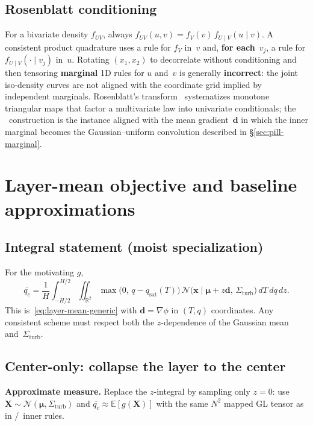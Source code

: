 \documentclass[11pt,a4paper]{article}
\begin{document}
\subsection{Rosenblatt conditioning}
\label{sec:rosenblatt}
For a bivariate density $f_{UV}$, always $f_{UV}(u,v)=f_V(v)\,f_{U\mid V}(u\mid v)$.
A consistent product quadrature uses a rule for $f_V$ in~$v$ and, \textbf{for each}~$v_j$, a rule for $f_{U\mid V}(\cdot\mid v_j)$ in~$u$.
Rotating $(x_1,x_2)$ to decorrelate without conditioning and then tensoring \textbf{marginal} 1D rules for $u$ and~$v$ is generally \textbf{incorrect}: the joint iso-density curves are not aligned with the coordinate grid implied by independent marginals.
Rosenblatt's transform~\cite{rosenblatt} systematizes monotone triangular maps that factor a multivariate law into univariate conditionals; the \profileros\ construction is the instance aligned with the mean gradient~$\mathbf{d}$ in which the inner marginal becomes the Gaussian--uniform convolution described in \S\ref{sec:pill-marginal}.

\section{Layer-mean objective and baseline approximations}
\label{sec:baselines}

\subsection{Integral statement (moist specialization)}
For the motivating $g$,
\begin{equation}
\label{eq:qc-integral}
  \overline{q_c} = \frac{1}{H}\int_{-H/2}^{H/2} \iint_{\mathbb{R}^2}
  \max\bigl(0,\, q - q_{\mathrm{sat}}(T)\bigr)\,
  \mathcal{N}\bigl(\mathbf{x}\mid \boldsymbol{\mu}+z\mathbf{d},\,\Sigma_{\mathrm{turb}}\bigr)\,dT\,dq\,dz .
\end{equation}
This is~\eqref{eq:layer-mean-generic} with $\mathbf{d}=\nabla\phi$ in $(T,q)$ coordinates.
Any consistent scheme must respect both the $z$-dependence of the Gaussian mean and~$\Sigma_{\mathrm{turb}}$.

\subsection{Center-only: collapse the layer to the center}
\textbf{Approximate measure.}
Replace the $z$-integral by sampling only $z=0$: use $\mathbf{X}\sim\mathcal{N}(\boldsymbol{\mu},\Sigma_{\mathrm{turb}})$ and $\overline{q_c}\approx\mathbb{E}[g(\mathbf{X})]$ with the same $N^2$ mapped GL tensor as in \momentmatched/\columntensor\ inner rules.
\end{document}
